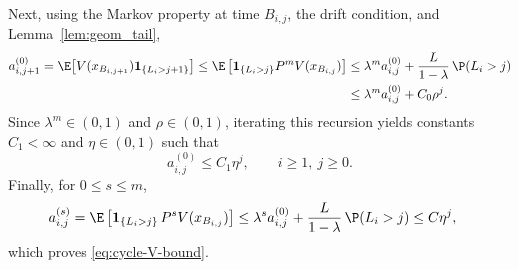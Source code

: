 \documentclass[mnsc,nonblindrev]{informs3}
\begin{document}
Next, using the Markov property at time \(B_{i,j}\), the drift condition, and
Lemma~\ref{lem:geom_tail},
\begin{align*}
a_{i,j+1}^{(0)}
=
\E\!\left[V(x_{B_{i,j+1}})\mathbf 1_{\{L_i>j+1\}}\right] \le
\E\left[\mathbf 1_{\{L_i>j\}}P^mV(x_{B_{i,j}})\right] &\le
\lambda^m a_{i,j}^{(0)}
+
\frac{L}{1-\lambda}\,\P(L_i>j) \\
&\le
\lambda^m a_{i,j}^{(0)}+C_0\rho^j.
\end{align*}
Since \(\lambda^m\in(0,1)\) and \(\rho\in(0,1)\), iterating this recursion yields
constants \(C_1<\infty\) and \(\eta\in(0,1)\) such that
\[
a_{i,j}^{(0)}\le C_1\eta^j,
\qquad i\ge1,\ j\ge0.
\]
Finally, for \(0\le s\le m\),
\begin{align*}
a_{i,j}^{(s)}
&=
\E\left[\mathbf 1_{\{L_i>j\}}\,P^sV(x_{B_{i,j}})\right] \le
\lambda^s a_{i,j}^{(0)}+\frac{L}{1-\lambda}\,\P(L_i>j)
\le C\eta^j,
\end{align*}
which proves \eqref{eq:cycle-V-bound}.
\end{document}
